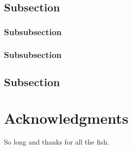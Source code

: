 \documentclass[fleqn,10pt,lineno]{wlpeerj}
\begin{document}
\lipsum[10] %

\subsection*{Subsection}

\lipsum[11] %

\subsubsection*{Subsubsection}

\lipsum[12] %

\subsubsection*{Subsubsection}

\lipsum[14] %

\subsection*{Subsection}

\lipsum[15-20] %

\section*{Acknowledgments}

So long and thanks for all the fish.


\end{document}
